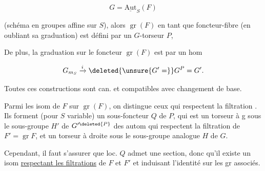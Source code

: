 

\[
G=\underline{\mathrm{Aut}}_S(F)
\]

(schéma en groupes affine sur $S$), alors $\operatorname{gr}(F)$ en tant que foncteur-fibre (en oubliant sa graduation) est défini par un $G$-torseur $P$, 

De plus, la graduation sur  le foncteur  $\operatorname{gr}(F)$ est  par un hom

\[
G_{m_S}\xrightarrow{i}\deleted{\unsure{G'=}}G^P=G'.
\]

Toutes ces constructions sont can. et compatibles avec changement de base.

Parmi les isom de $F$ sur $\operatorname{gr}(F)$, on distingue ceux qui respectent la filtration . Ils forment (pour $S$ variable) un sous-foncteur $Q$ de $P$, qui est un torseur à g sous le sous-groupe $H'$ de $G'^{\deleted{P}}$ des autom qui respectent la filtration  de $F'=\operatorname{gr}F$, et un torseur à droite sous le sous-groupe analogue $H$ de $G$.


Cependant,  il faut s'assurer que loc.  $Q$ admet une section, donc qu'il existe un isom \uline{respectant les filtrations} de $F$ et $F'$ et induisant l'identité sur les gr associés.
